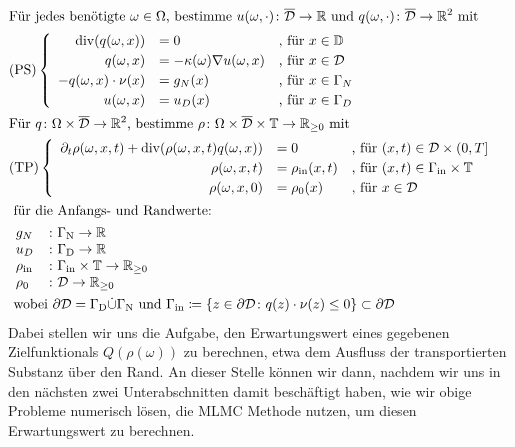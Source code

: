 \begin{align*}
\setlength\arraycolsep{1pt}
&\text{Für jedes benötigte } \omega \in \Omega \text{, bestimme } u(\omega,\cdot)\colon \overline{\mathcal{D}} \to \R \text{ und } q(\omega, \cdot) \colon \overline{\mathcal{D}} \to \R^2 \text{ mit } \\
&\text{(PS)}
	\begin{cases}
		\begin{array}{rlll}
		\dive (q(\omega,x)) &= 0  &\text{, für } x \in \mathbb{ D}\\  
		q(\omega,x) &= - \kappa(\omega) \nabla u(\omega,x)  &\text{, für } x \in \mathcal{D}\\
		-q(\omega,x) \cdot \nu(x) &= g_N(x)  &\text{, für } x \in \Gamma_N \\
		u(\omega,x) &= u_D(x)  &\text{, für } x \in \Gamma_D \\
		\end{array}
	\end{cases} \\
&\text{Für } q\colon \Omega \times \overline{\mathcal{D}} \to \R^2 \text{, bestimme }\rho \colon \Omega \times \overline{\mathcal{D}} \times \mathbb{T} \to \R_{\geq 0} \text{ mit} \\
&\text{(TP)} 
	\begin{cases}
		\begin{array}{rlll}
			\partial_t \rho (\omega, x, t) + \dive(\rho(\omega,x,t)q(\omega,x)) &= 0 &\text{, für } (x,t) \in \mathcal{D} \times (0,T] \\
			\rho(\omega,x,t) &= \rho_{\text{in}}(x,t) &\text{, für } (x,t) \in \Gamma_{\text{in}} \times \mathbb{T} \\
			\rho(\omega,x,0)  &= \rho_0(x) &\text{, für } x \in  \mathcal{D}
		\end{array}
	\end{cases} \\
&\text{ für die Anfangs- und Randwerte: } \\ 
	&\begin{array}{llr}
		g_N&\colon \Gamma_{\text{N}} \to \R \\
		u_D&\colon \Gamma_{\text{D}} \to \R \\
	    \rho_{\text{in}}&\colon \Gamma_{\text{in}} \times \mathbb{T} \to \R_{\geq0} \\
		\rho_0&\colon \mathcal{D} \to \R_{\geq0} \\
	\end{array} \newline \\
&\text{ wobei } \partial \mathcal{D} = \Gamma_{\text{D}} \dot{\cup} \Gamma_{\text{N}}  \text{ und }  \Gamma_{\text{in}} \coloneqq  \{ z \in \partial \mathcal{D}\colon q(z)\cdot \nu(z) \leq 0 \} \subset  \partial \mathcal{D}
\end{align*}
Dabei stellen wir uns die Aufgabe, den Erwartungswert eines gegebenen Zielfunktionals $Q(\rho(\omega))$ zu berechnen, etwa dem Ausfluss der transportierten Substanz über den Rand. An dieser Stelle können wir dann, nachdem wir uns in den nächsten zwei Unterabschnitten damit beschäftigt haben, wie wir obige Probleme numerisch lösen, die MLMC Methode nutzen, um diesen Erwartungswert zu berechnen. 

